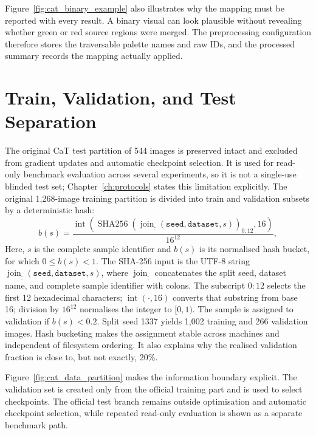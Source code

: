 Figure~\ref{fig:cat_binary_example} also illustrates why the mapping must be
reported with every result. A binary visual can look plausible without
revealing whether green or red source regions were merged. The preprocessing
configuration therefore stores the traversable palette names and raw IDs, and
the processed summary records the mapping actually applied.

\section{Train, Validation, and Test Separation}

The original CaT test partition of 544 images is preserved intact and excluded
from gradient updates and automatic checkpoint selection. It is used for
read-only benchmark evaluation across several experiments, so it is not a
single-use blinded test set; Chapter~\ref{ch:protocols} states this limitation
explicitly. The original 1,268-image training partition is divided
into train and validation subsets by a deterministic hash:
\begin{equation}
 b(s)=
 \frac{
   \operatorname{int}\!\left(
   \operatorname{SHA256}\!\left(
     \operatorname{join}_{\texttt{:}}(\texttt{seed},\texttt{dataset},s)
   \right)_{0:12},16
   \right)}
 {16^{12}},
 \end{equation}
Here, $s$ is the complete sample identifier and $b(s)$ is its normalised hash
bucket, for which $0\leq b(s)<1$. The SHA-256 input is the UTF-8 string
$\operatorname{join}_{\texttt{:}}(\texttt{seed},\texttt{dataset},s)$, where
$\operatorname{join}_{\texttt{:}}$ concatenates the split seed, dataset name,
and complete sample identifier with colons. The subscript $0{:}12$ selects the
first 12 hexadecimal characters; $\operatorname{int}(\cdot,16)$ converts that
substring from base 16; division by $16^{12}$ normalises the integer to
$[0,1)$.
The sample is assigned to validation if $b(s)<0.2$. Split seed 1337 yields
1,002 training and 266 validation images. Hash bucketing makes the assignment
stable across machines and independent of filesystem ordering. It also
explains why the realised validation fraction is close to, but not exactly,
20\%.

Figure~\ref{fig:cat_data_partition} makes the information boundary explicit.
The validation set is created only from the official training part and is used
to select checkpoints. The official test branch remains outside optimisation
and automatic checkpoint selection, while repeated read-only evaluation is
shown as a separate benchmark path.

